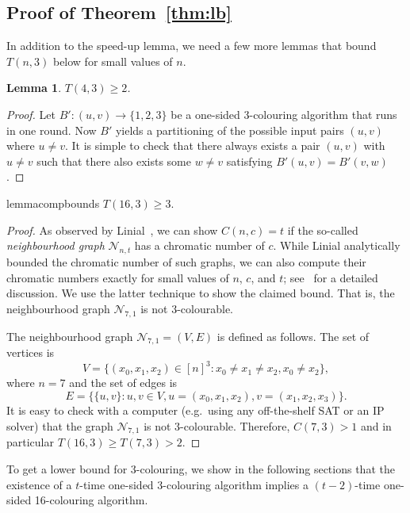 \documentclass[a4paper,11pt]{article}
\newtheorem{lemma}[theorem]{Lemma}
\theoremstyle{remark}
\begin{document}
\subsection{Proof of Theorem~\ref{thm:lb}}

In addition to the speed-up lemma, we need a few more lemmas that bound $T(n,3)$ below for small values of $n$.

\begin{lemma}\label{lemma:4to3}
 $T(4,3) \ge 2$.
\end{lemma}
\begin{proof}
 Let $B' \colon (u,v) \to \{1,2,3\}$ be a one-sided 3-colouring algorithm that runs in one round. Now $B'$ yields a partitioning of the possible input pairs $(u,v)$ where $u \neq v$. It is simple to check that there always exists a pair $(u,v)$ with $u\neq v$ such that there also exists some $w \neq v$ satisfying $B'(u,v) = B'(v,w)$.
\end{proof}

\begin{restatable}{lemma}{compbounds}
 \label{lemma:comp-bounds}
 $T(16,3) \ge 3$.
\end{restatable}
\begin{proof}
As observed by Linial~\cite{linial92locality}, we can show $C(n,c) = t$ if the so-called \emph{neighbourhood graph} $\mathcal{N}_{n,t}$ has a chromatic number of $c$. While Linial analytically bounded the chromatic number of such graphs, we can also compute their chromatic numbers exactly for small values of $n$, $c$, and $t$; see~\cite{rybicki11msc} for a detailed discussion. We use the latter technique to show the claimed bound. That is, the neighbourhood graph $\mathcal{N}_{7,1}$ is not 3-colourable. 

The neighbourhood graph $\mathcal{N}_{7,1} = (V,E)$ is defined as follows. The set of vertices is 
\[
 V = \{ (x_0, x_1, x_2) \in [n]^3 : x_0 \neq x_1 \neq x_2, x_0 \neq x_2 \},
\]
where $n = 7$ and the set of edges is 
\[
 E = \{ \{u,v\} : u,v \in V, u=(x_0, x_1, x_2), v= (x_1, x_2, x_3) \}.
\]
It is easy to check with a computer (e.g.\ using any off-the-shelf SAT or an IP solver) that the graph $\mathcal{N}_{7,1}$ is not 3-colourable. Therefore, $C(7,3) > 1$ and in particular $T(16,3) \ge T(7,3) > 2$.
\end{proof}

To get a lower bound for 3-colouring, we show in the following sections that the existence of a $t$-time one-sided 3-colouring algorithm implies a $(t-2)$-time one-sided 16-colouring algorithm. 
\end{document}

